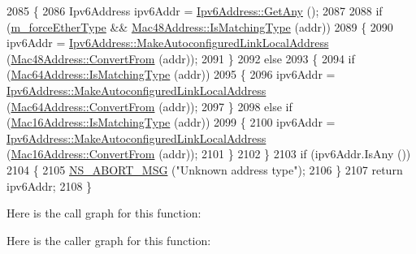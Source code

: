 \begin{DoxyCode}
2085 \{
2086   Ipv6Address ipv6Addr = \hyperlink{classns3_1_1Ipv6Address_a2783e8badfc98c8b0a8508bba6e1b91e}{Ipv6Address::GetAny} ();
2087 
2088   \textcolor{keywordflow}{if} (\hyperlink{classns3_1_1SixLowPanNetDevice_a57d9f56656023ad738e092ba9f668192}{m\_forceEtherType} && \hyperlink{classns3_1_1Mac48Address_a55cc1e3c6aa63fd1a4f8f7d9be4ae182}{Mac48Address::IsMatchingType} (addr))
2089     \{
2090       ipv6Addr = \hyperlink{classns3_1_1Ipv6Address_af57fd659aa3c06013ce1b75fb97f9fc5}{Ipv6Address::MakeAutoconfiguredLinkLocalAddress}
       (\hyperlink{classns3_1_1Mac48Address_a911ce13603a9ef837545a032b6523ae4}{Mac48Address::ConvertFrom} (addr));
2091     \}
2092   \textcolor{keywordflow}{else}
2093     \{
2094       \textcolor{keywordflow}{if} (\hyperlink{classns3_1_1Mac64Address_a50014d1350f72b89857f0262be927073}{Mac64Address::IsMatchingType} (addr))
2095         \{
2096           ipv6Addr = \hyperlink{classns3_1_1Ipv6Address_af57fd659aa3c06013ce1b75fb97f9fc5}{Ipv6Address::MakeAutoconfiguredLinkLocalAddress}
       (\hyperlink{classns3_1_1Mac64Address_a9d73aef28cf6b6edf423b418ce014b10}{Mac64Address::ConvertFrom} (addr));
2097         \}
2098       \textcolor{keywordflow}{else} \textcolor{keywordflow}{if} (\hyperlink{classns3_1_1Mac16Address_a2d7aa9e24afc8e02a25ab449b0b99b1f}{Mac16Address::IsMatchingType} (addr))
2099         \{
2100           ipv6Addr = \hyperlink{classns3_1_1Ipv6Address_af57fd659aa3c06013ce1b75fb97f9fc5}{Ipv6Address::MakeAutoconfiguredLinkLocalAddress}
       (\hyperlink{classns3_1_1Mac16Address_a6822cde696a7be24782dc8e1de2f1449}{Mac16Address::ConvertFrom} (addr));
2101         \}
2102     \}
2103   \textcolor{keywordflow}{if} (ipv6Addr.IsAny ())
2104     \{
2105       \hyperlink{group__fatal_ga51ac4699be799d772ae7258d1ef6af21}{NS\_ABORT\_MSG} (\textcolor{stringliteral}{"Unknown address type"});
2106     \}
2107   \textcolor{keywordflow}{return} ipv6Addr;
2108 \}
\end{DoxyCode}


Here is the call graph for this function\+:




Here is the caller graph for this function\+:



